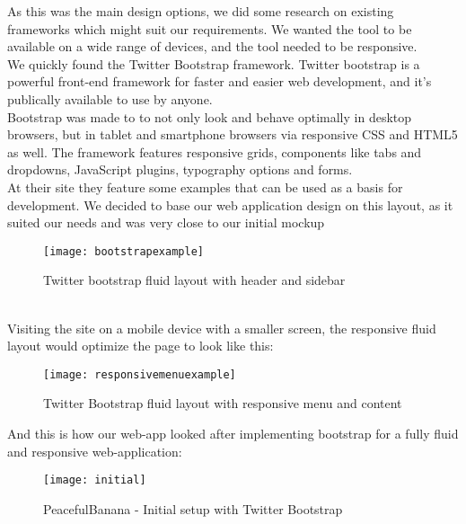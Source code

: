 As this was the main design options, we did some research on existing frameworks which might suit our requirements. We wanted the tool to be available on a wide range of devices, and the tool needed to be responsive.\\ 
We quickly found the Twitter Bootstrap framework\cite{twitterbootstrap}. Twitter bootstrap is a powerful front-end framework for faster and easier web development, and it's publically available to use by anyone.\\Bootstrap was made to to not only look and behave optimally in desktop browsers, but in tablet and smartphone browsers via responsive CSS and HTML5 as well. The framework features responsive grids, components like tabs and dropdowns, JavaScript plugins, typography options and forms. \\
\newpage
At their site they feature some examples that can be used as a basis for development. We decided to base our web application design on this layout, as it suited our needs and was very close to our initial mockup
\begin{figure}[h!]
\label{bootstrapexample}
\centering
	\texttt{[image: bootstrapexample]}
\caption{Twitter bootstrap fluid layout with header and sidebar}
\end{figure}
\\
Visiting the site on a mobile device with a smaller screen, the responsive fluid layout would optimize the page to look like this:
\begin{figure}[h!]
\label{bootstrapresponsive}
\centering
	\texttt{[image: responsivemenuexample]}
\caption{Twitter Bootstrap fluid layout with responsive menu and content}
\end{figure}
\newpage
And this is how our web-app looked after implementing bootstrap for a fully fluid and responsive web-application:
\begin{figure}[h!]
\label{teamscreen}
\centering
	\texttt{[image: initial]}
\caption{PeacefulBanana - Initial setup with Twitter Bootstrap}
\end{figure}

